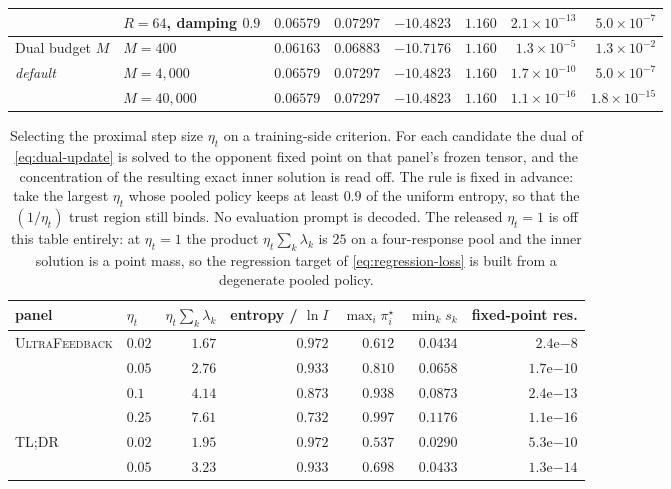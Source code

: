 \documentclass{article}
\theoremstyle{remark}
\theoremstyle{plain}
\begin{document}
\begin{table}[t]
\begin{tabular}{llrrrrrr}
 & $R=64$, damping $0.9$ & $0.06579$ & $0.07297$ & $-10.4823$ & $1.160$ & $2.1\times10^{-13}$ & $5.0\times10^{-7}$\\
\midrule
Dual budget $M$ & $M=400$ & $0.06163$ & $0.06883$ & $-10.7176$ & $1.160$ & $1.3\times10^{-5}$ & $1.3\times10^{-2}$\\
\emph{default} & $M=4{,}000$ & $0.06579$ & $0.07297$ & $-10.4823$ & $1.160$ & $1.7\times10^{-10}$ & $5.0\times10^{-7}$\\
 & $M=40{,}000$ & $0.06579$ & $0.07297$ & $-10.4823$ & $1.160$ & $1.1\times10^{-16}$ & $1.8\times10^{-15}$\\
\bottomrule
\end{tabular}
\end{table}


\begin{table}[t]
\centering\footnotesize
\setlength{\tabcolsep}{3.2pt}
\caption{Selecting the proximal step size $\eta_t$ on a training-side criterion. For each candidate the dual of \eqref{eq:dual-update} is solved to the opponent fixed point on that panel's frozen tensor, and the concentration of the resulting exact inner solution is read off. The rule is fixed in advance: take the largest $\eta_t$ whose pooled policy keeps at least $0.9$ of the uniform entropy, so that the $(1/\eta_t)$ trust region still binds. No evaluation prompt is decoded. The released $\eta_t=1$ is off this table entirely: at $\eta_t=1$ the product $\eta_t\sum_k\lambda_k$ is $25$ on a four-response pool and the inner solution is a point mass, so the regression target of \eqref{eq:regression-loss} is built from a degenerate pooled policy.}
\label{tab:eta-selection}
\begin{tabular}{llrrrrr}
\toprule
panel & $\eta_t$ & $\eta_t\sum_k\lambda_k$ & entropy / $\ln I$ & $\max_i\pi^\star_i$ & $\min_k s_k$ & fixed-point res.\\
\midrule
\textsc{UltraFeedback} & $0.02$ & $1.67$ & $0.972$ & $0.612$ & $0.0434$ & $2.4\mathrm{e}{-8}$\\
 & $\mathbf{0.05}$ & $2.76$ & $\mathbf{0.933}$ & $0.810$ & $0.0658$ & $1.7\mathrm{e}{-10}$\\
 & $0.1$ & $4.14$ & $0.873$ & $0.938$ & $0.0873$ & $2.4\mathrm{e}{-13}$\\
 & $0.25$ & $7.61$ & $0.732$ & $0.997$ & $0.1176$ & $1.1\mathrm{e}{-16}$\\
\midrule
\textsc{TL;DR} & $0.02$ & $1.95$ & $0.972$ & $0.537$ & $0.0290$ & $5.3\mathrm{e}{-10}$\\
 & $\mathbf{0.05}$ & $3.23$ & $\mathbf{0.933}$ & $0.698$ & $0.0433$ & $1.3\mathrm{e}{-14}$\\

\end{tabular}
\end{table}
\end{document}

